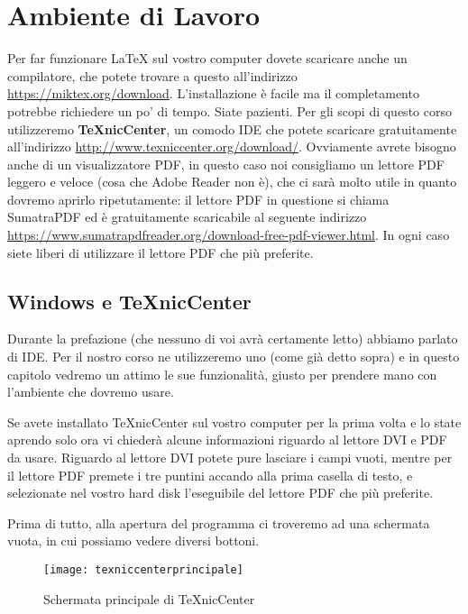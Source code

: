 \chapter{Ambiente di Lavoro}

Per far funzionare \LaTeX{} sul vostro computer dovete scaricare anche un
compilatore, che potete trovare a questo all'indirizzo
\url{https://miktex.org/download}. L'installazione è facile ma il completamento
potrebbe richiedere un po' di tempo. Siate pazienti.
Per gli scopi di questo corso utilizzeremo \textbf{TeXnicCenter}, un comodo IDE
che potete scaricare gratuitamente all'indirizzo
\url{http://www.texniccenter.org/download/}.
Ovviamente avrete bisogno anche di un visualizzatore PDF, in questo caso noi
consigliamo un lettore PDF leggero e veloce (cosa che Adobe Reader non è), che
ci sarà molto utile in quanto dovremo aprirlo ripetutamente: il lettore PDF in
questione si chiama SumatraPDF ed è gratuitamente scaricabile al seguente
indirizzo \url{https://www.sumatrapdfreader.org/download-free-pdf-viewer.html}.
In ogni caso siete liberi di utilizzare il lettore PDF che più preferite.

\section{Windows e TeXnicCenter}

Durante la prefazione (che nessuno di voi avrà certamente letto) abbiamo
parlato di IDE. Per il nostro corso ne utilizzeremo uno (come già detto sopra)
e in questo capitolo vedremo un attimo le sue funzionalità, giusto per prendere
mano con l'ambiente che dovremo usare.

Se avete installato TeXnicCenter sul vostro computer per la prima volta e lo
state aprendo solo ora vi chiederà alcune informazioni riguardo al lettore DVI
e PDF da usare. Riguardo al lettore DVI potete pure lasciare i campi vuoti,
mentre per il lettore PDF premete i tre puntini accando alla prima casella di
testo, e selezionate nel vostro hard disk l'eseguibile del lettore PDF che più
preferite.

Prima di tutto, alla apertura del programma ci troveremo ad una schermata
vuota, in cui possiamo vedere diversi bottoni.

\begin{figure}[H]
  \centering
  \texttt{[image: texniccenterprincipale]}
  \caption{Schermata principale di TeXnicCenter}
  \label{img:principale_texcenter}
\end{figure}


